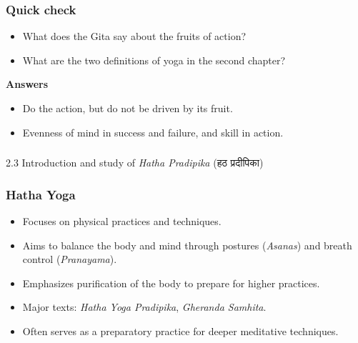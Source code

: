 \begin{frame}[fragile]\frametitle{Quick check}

    \begin{itemize}
        \item What does the Gita say about the fruits of action?
        \item What are the two definitions of yoga in the second chapter?
    \end{itemize}
    \vspace{0.5em}
    \textbf{Answers}
    \begin{itemize}
        \item Do the action, but do not be driven by its fruit.
        \item Evenness of mind in success and failure, and skill in action.
    \end{itemize}

\end{frame}

\begin{frame}[fragile]\frametitle{}
\begin{center}
{\Large 2.3 Introduction and study of \textit{Hatha Pradipika} (हठ प्रदीपिका)}
\end{center}
\end{frame}

\begin{frame}[fragile]\frametitle{Hatha Yoga}

      \begin{itemize}
		\item Focuses on physical practices and techniques.
		\item Aims to balance the body and mind through postures (\textit{Asanas}) and breath control (\textit{Pranayama}).
		\item Emphasizes purification of the body to prepare for higher practices.
		\item Major texts: \textit{Hatha Yoga Pradipika}, \textit{Gheranda Samhita}.
		\item Often serves as a preparatory practice for deeper meditative techniques.
	  \end{itemize}

\end{frame}

